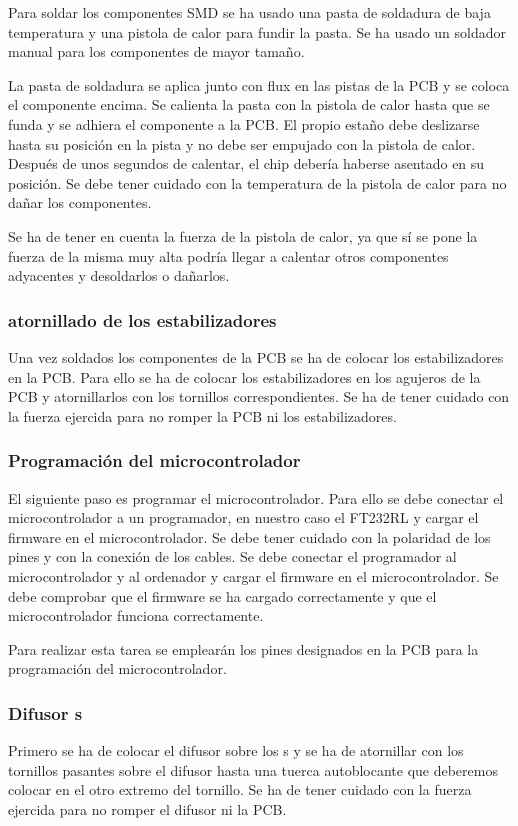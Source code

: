 Para soldar los componentes SMD se ha usado una pasta de soldadura de baja temperatura y una pistola de calor para fundir la pasta. Se ha usado un soldador manual para los componentes de mayor tamaño.

La pasta de soldadura se aplica junto con flux en las pistas de la \gls{PCB} y se coloca el componente encima. Se calienta la pasta con la pistola de calor hasta que se funda y se adhiera el componente a la \gls{PCB}. El propio estaño debe deslizarse hasta su posición en la pista y no debe ser empujado con la pistola de calor. Después de unos segundos de calentar, el chip debería haberse asentado en su posición. Se debe tener cuidado con la temperatura de la pistola de calor para no dañar los componentes.

Se ha de tener en cuenta la fuerza de la pistola de calor, ya que sí se pone la fuerza de la misma muy alta podría llegar a calentar otros componentes adyacentes y desoldarlos o dañarlos. \cite{SoldaduraSMD}

\subsubsection{atornillado de los estabilizadores}
Una vez soldados los componentes de la \gls{PCB} se ha de colocar los estabilizadores en la \gls{PCB}. Para ello se ha de colocar los estabilizadores en los agujeros de la \gls{PCB} y atornillarlos con los tornillos correspondientes. Se ha de tener cuidado con la fuerza ejercida para no romper la \gls{PCB} ni los estabilizadores.

\subsubsection{Programación del microcontrolador}
El siguiente paso es programar el microcontrolador. Para ello se debe conectar el microcontrolador a un programador, en nuestro caso el FT232RL y cargar el firmware en el microcontrolador. Se debe tener cuidado con la polaridad de los pines y con la conexión de los cables. Se debe conectar el programador al microcontrolador y al ordenador y cargar el firmware en el microcontrolador. Se debe comprobar que el firmware se ha cargado correctamente y que el microcontrolador funciona correctamente.

Para realizar esta tarea se emplearán los pines designados en la \gls{PCB} para la programación del microcontrolador.

\subsubsection{Difusor s}
Primero se ha de colocar el difusor sobre los s y se ha de atornillar con los tornillos pasantes sobre el difusor hasta una tuerca autoblocante que deberemos colocar en el otro extremo del tornillo. Se ha de tener cuidado con la fuerza ejercida para no romper el difusor ni la \gls{PCB}.

